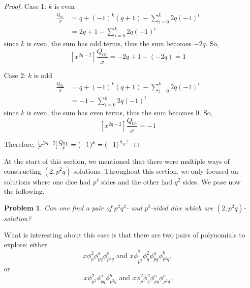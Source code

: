 \documentclass[11pt]{amsart}
\numberwithin{equation}{section}
\theoremstyle{plain}
\newtheorem {problem}[equation]{Problem}
\theoremstyle{definition}
\begin{document}
\begin{proof}
Case 1: $k$ is even
\begin{align*}
[x^{2q-2}]\frac{Q_{01}}{x}&=q+(-1)^k(q+1)-\sum_{i=0}^{k}2q(-1)^i\\
&=2q+1-\sum_{i=0}^{k}2q(-1)^i
\end{align*}
since $k$ is even, the sum has odd terms, thus the sum becomes $-2q$. So,
$$[x^{2q-2}]\frac{Q_{01}}{x}=-2q+1-(-2q)=1$$

Case 2: $k$ is odd
\begin{align*}
[x^{2q-2}]\frac{Q_{01}}{x}&=q+(-1)^k(q+1)-\sum_{i=0}^{k}2q(-1)^i\\
&=-1-\sum_{i=0}^{k}2q(-1)^i
\end{align*}
since $k$ is even, the sum has even terms, thus the sum becomes $0$. So,
$$[x^{2q-2}]\frac{Q_{01}}{x}=-1$$

Therefore, $[x^{2q-2}]\frac{Q_{01}}{x}=(-1)^k=(-1)^{q-1\over 2}$




\end{proof}

At the start of this section, we mentioned that there were multiple ways of constructing $(2,p^2q)$-solutions. Throughout this section, we only focused on solutions where one dice had $p^4$ sides and the other had $q^2$ sides. We pose now the following. 

\begin{problem}\label{prob:open}
Can one find a pair of $p^2q^2$- and $p^2$-sided dice which are $(2,p^2q)$-solution?
\end{problem}

What is interesting about this case is that there are two pairs of polynomials to explore: either
\[x{{\phi}_{p}^2{\phi}_{pq}^a{\phi}_{p^2q}^b \text{ and }x\phi}_{p^2}^2{\phi}_{q}^2{\phi}_{pq}^a{\phi}_{p^2q}^b,\]
or
\[x{\phi}_{p^2}^2{\phi}_{pq}^a{\phi}_{p^2q}^b \text{ and }x{\phi}_{p}^2{\phi}_{q}^2{\phi}_{pq}^a{\phi}_{p^2q}^b.\]
\end{document}
